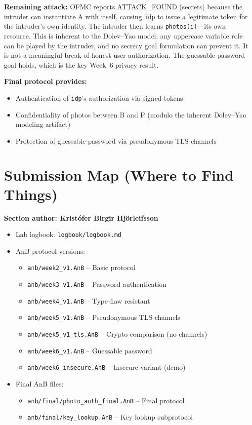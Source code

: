 \documentclass[11pt,a4paper]{article}
\newcommand{\sectionauthor}[1]{\noindent\textbf{Section author: #1}\par\medskip}
\begin{document}
\textbf{Remaining attack:} OFMC reports ATTACK\_FOUND (secrets) because the intruder
can instantiate A with itself, causing \texttt{idp} to issue a legitimate token for the intruder's
own identity. The intruder then learns \texttt{photos(i)}---its own resource.
This is inherent to the Dolev--Yao model: any uppercase variable role can be played by the
intruder, and no secrecy goal formulation can prevent it. It is not a meaningful break of
honest-user authorization. The guessable-password goal holds, which is the key
Week~6 privacy result.

\textbf{Final protocol provides:}
\begin{itemize}[leftmargin=*]
  \item Authentication of \texttt{idp}'s authorization via signed tokens
  \item Confidentiality of photos between B and P (modulo the inherent Dolev--Yao modeling artifact)
  \item Protection of guessable password via pseudonymous TLS channels
\end{itemize}

\appendix
\section{Submission Map (Where to Find Things)}
\sectionauthor{Kristófer Birgir Hjörleifsson}

\begin{itemize}[leftmargin=*]
  \item Lab logbook: \texttt{logbook/logbook.md}
  \item AnB protocol versions:
    \begin{itemize}
      \item \texttt{anb/week2\_v1.AnB} -- Basic protocol
      \item \texttt{anb/week3\_v1.AnB} -- Password authentication
      \item \texttt{anb/week4\_v1.AnB} -- Type-flaw resistant
      \item \texttt{anb/week5\_v1.AnB} -- Pseudonymous TLS channels
      \item \texttt{anb/week5\_v1\_tls.AnB} -- Crypto comparison (no channels)
      \item \texttt{anb/week6\_v1.AnB} -- Guessable password
      \item \texttt{anb/week6\_insecure.AnB} -- Insecure variant (demo)
    \end{itemize}
  \item Final AnB files:
    \begin{itemize}
      \item \texttt{anb/final/photo\_auth\_final.AnB} -- Final protocol
      \item \texttt{anb/final/key\_lookup.AnB} -- Key lookup subprotocol
    \end{itemize}
\end{itemize}
\end{document}
